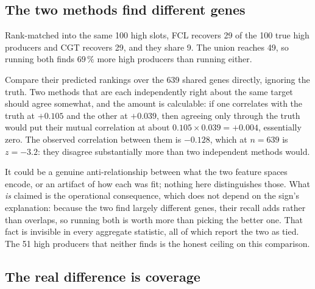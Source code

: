
\subsection{The two methods find different genes}

Rank-matched into the same 100 high slots, FCL recovers 29 of the 100 true high producers
and CGT recovers 29, and they share 9. The union reaches 49, so running both finds $69\,\%$
more high producers than running either.

 Compare their predicted rankings over the 639 shared genes directly, ignoring the
truth. Two methods that are each independently right about the same target should agree
somewhat, and the amount is calculable: if one correlates with the truth at $+0.105$ and the
other at $+0.039$, then agreeing only through the truth would put their mutual correlation
at about $0.105 \times 0.039 = +0.004$, essentially zero. The observed correlation between
them is $\mathbf{-0.128}$, which at $n = 639$ is $z = -3.2$: they disagree substantially
more than two independent methods would.

 It could be a genuine
anti-relationship between what the two feature spaces encode, or an artifact of how each was
fit; nothing here distinguishes those. What \emph{is} claimed is the operational
consequence, which does not depend on the sign's explanation: because the two find largely
different genes, their recall adds rather than overlaps, so running both is worth more than
picking the better one. That fact is invisible in every aggregate statistic, all of which
report the two as tied. The 51 high producers that neither finds is the honest ceiling on
this comparison.

\subsection{The real difference is coverage}

